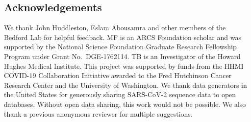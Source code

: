 \subsection*{Acknowledgements}%

We thank John Huddleston, Eslam Abousamra and other members of the Bedford Lab for helpful feedback.
MF is an ARCS Foundation scholar and was supported by the National Science Foundation Graduate Research Fellowship Program under Grant No.\ DGE-1762114.
TB is an Investigator of the Howard Hughes Medical Institute.
This project was supported by funds from the HHMI COVID-19 Collaboration Initiative awarded to the Fred Hutchinson Cancer Research Center and the University of Washington.
We thank data generators in the United States for generously sharing SARS-CoV-2 sequence data to open databases. Without open data sharing, this work would not be possible.
We also thank a previous anonymous reviewer for multiple suggestions.
